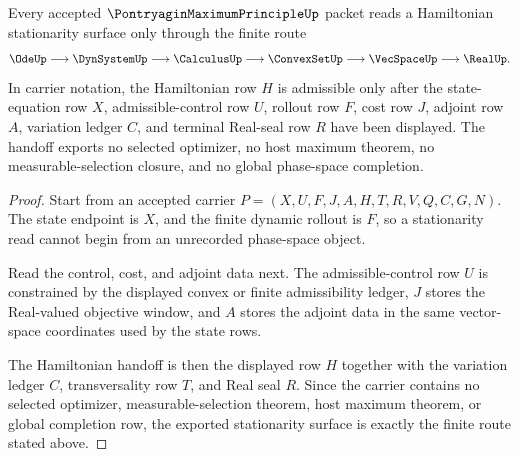 \begin{theorem}
\label{thm:pontryagin-maximum-principle-hamiltonian-handoff}
Every accepted $\PontryaginMaximumPrincipleUp$ packet reads a Hamiltonian stationarity surface only through the finite route
$$
\OdeUp \longrightarrow \DynSystemUp \longrightarrow \CalculusUp \longrightarrow \ConvexSetUp \longrightarrow \VecSpaceUp \longrightarrow \RealUp .
$$
In carrier notation, the Hamiltonian row $H$ is admissible only after the state-equation row $X$, admissible-control row $U$, rollout row $F$, cost row $J$, adjoint row $A$, variation ledger $C$, and terminal Real-seal row $R$ have been displayed. The handoff exports no selected optimizer, no host maximum theorem, no measurable-selection closure, and no global phase-space completion.
\end{theorem}
\begin{proof}
Start from an accepted carrier $P=(X,U,F,J,A,H,T,R,V,Q,C,G,N)$. The state endpoint is $X$, and the finite dynamic rollout is $F$, so a stationarity read cannot begin from an unrecorded phase-space object.

Read the control, cost, and adjoint data next. The admissible-control row $U$ is constrained by the displayed convex or finite admissibility ledger, $J$ stores the Real-valued objective window, and $A$ stores the adjoint data in the same vector-space coordinates used by the state rows.

The Hamiltonian handoff is then the displayed row $H$ together with the variation ledger $C$, transversality row $T$, and Real seal $R$. Since the carrier contains no selected optimizer, measurable-selection theorem, host maximum theorem, or global completion row, the exported stationarity surface is exactly the finite route stated above.
\end{proof}




